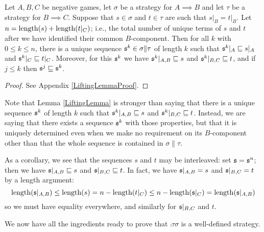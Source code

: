 \documentclass[11pt]{article} %
\begin{document}
\begin{lemma}
  \label{LiftingLemma}
  Let $A,B,C$ be negative games, let $\sigma$ be a strategy for $A\implies B$ and let $\tau$ be a strategy for $B\implies C$.  Suppose that $s\in\sigma$ and $t\in\tau$ are such that $s\vert_B=t\vert_B$.  Let $n=\operatorname{length}(s)+\operatorname{length}(t\vert_C)$; i.e., the total number of unique terms of $s$ and $t$ after we have identified their common $B$-component.  Then for all $k$ with $0\le k\le n$, there is a unique sequence $\mathfrak s^k\in\sigma\|\tau$ of length $k$ such that $\mathfrak s^k\vert_A\sqsubseteq s\vert_A$ and $\mathfrak s^k\vert_C\sqsubseteq t\vert_C$.  Moreover, for this $\mathfrak s^k$ we have $\mathfrak s^k\vert_{A,B}\sqsubseteq s$ and $\mathfrak s^k\vert_{B,C}\sqsubseteq t$, and if $j\le k$ then $\mathfrak s^j\sqsubseteq \mathfrak s^k$.  
  \begin{proof}
    See Appendix \ref{LiftingLemmaProof}.
  \end{proof}
\end{lemma}

Note that Lemma \ref{LiftingLemma} is stronger than saying that there is a unique sequence $\mathfrak s^k$ of length $k$ such that $\mathfrak s^k\vert_{A,B}\sqsubseteq s$ and $\mathfrak s^k\vert_{B,C}\sqsubseteq t$.  Instead, we are saying that there exists a sequence $\mathfrak s^k$ with those properties, but that it is uniquely determined even when we make no requirement on its $B$-component other than that the whole sequence is contained in $\sigma\|\tau$.

As a corollary, we see that the sequences $s$ and $t$ may be interleaved: set $\mathfrak s=\mathfrak s^n$; then we have $\mathfrak s\vert_{A,B}\sqsubseteq s$ and $\mathfrak s\vert_{B,C}\sqsubseteq t$.  In fact, we have $\mathfrak s\vert_{A,B}=s$ and $\mathfrak s\vert_{B,C}=t$ by a length argument:
\[
  \operatorname{length}(\mathfrak s\vert_{A,B})\le\operatorname{length}(s)=n-\operatorname{length}(t\vert_C)\le n-\operatorname{length}(\mathfrak s\vert_C)=\operatorname{length}(\mathfrak s\vert_{A,B})
  \]
so we must have equality everywhere, and similarly for $\mathfrak s\vert_{B,C}$ and $t$.

We now have all the ingredients ready to prove that $\comp\tau\sigma$ is a well-defined strategy.
\end{document}
